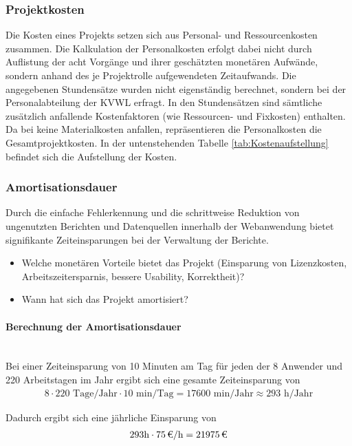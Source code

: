 \subsubsection{Projektkosten}
\label{sec:Projektkosten}
Die Kosten eines Projekts setzen sich aus Personal- und Ressourcenkosten zusammen. Die Kalkulation der Personalkosten erfolgt dabei nicht durch Auflistung der acht Vorgänge und ihrer geschätzten monetären Aufwände, sondern anhand des je Projektrolle aufgewendeten Zeitaufwands. Die angegebenen Stundensätze wurden nicht eigenständig berechnet, sondern bei der Personalabteilung der \ac{KVWL} erfragt. In den Stundensätzen sind sämtliche zusätzlich anfallende Kostenfaktoren (wie Ressourcen- und Fixkosten) enthalten. Da bei \projektName keine Materialkosten anfallen, repräsentieren die Personalkosten die Gesamtprojektkosten. In der untenstehenden Tabelle \ref{tab:Kostenaufstellung} befindet sich die Aufstellung der Kosten.

\subsubsection{Amortisationsdauer}
\label{sec:Amortisationsdauer}
Durch die einfache Fehlerkennung und die schrittweise Reduktion von ungenutzten Berichten und Datenquellen innerhalb der Webanwendung bietet \projektName signifikante Zeiteinsparungen bei der Verwaltung der Berichte.
\begin{itemize}
	\item Welche monetären Vorteile bietet das Projekt (\zB Einsparung von Lizenzkosten, Arbeitszeitersparnis, bessere Usability, Korrektheit)?
	\item Wann hat sich das Projekt amortisiert?
\end{itemize}

\paragraph{Berechnung der Amortisationsdauer} ~\\
Bei einer Zeiteinsparung von 10 Minuten am Tag für jeden der 8 Anwender und 220 Arbeitstagen im Jahr ergibt sich eine gesamte Zeiteinsparung von 
\begin{eqnarray}
8 \cdot 220 \mbox{ Tage/Jahr} \cdot 10 \mbox{ min/Tag} = 17600 \mbox{ min/Jahr} \approx 293 \mbox{ h/Jahr} 
\end{eqnarray}

Dadurch ergibt sich eine jährliche Einsparung von 
\begin{eqnarray}
293 \mbox{h} \cdot \eur{75}{\mbox{/h}} = \eur{21975}
\end{eqnarray}

